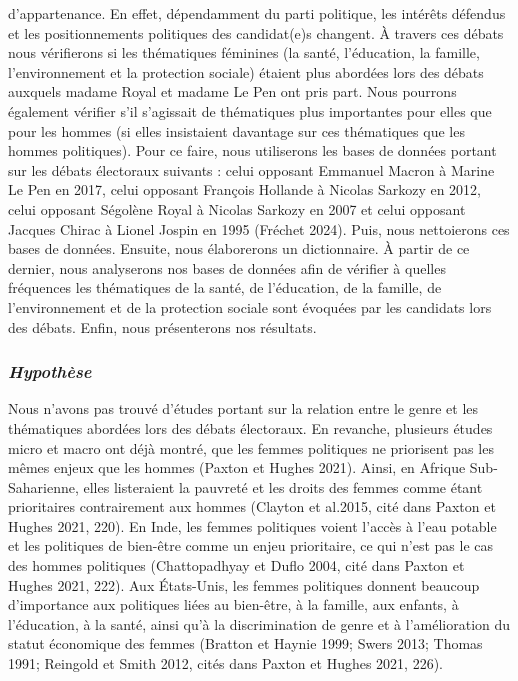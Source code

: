 \documentclass[
  letterpaper,
  DIV=11,
  numbers=noendperiod]{scrartcl}
\begin{document}
d'appartenance. En effet, dépendamment du parti politique, les intérêts
défendus et les positionnements politiques des candidat(e)s changent. À
travers ces débats nous vérifierons si les thématiques féminines (la
santé, l'éducation, la famille, l'environnement et la protection
sociale) étaient plus abordées lors des débats auxquels madame Royal et
madame Le Pen ont pris part. Nous pourrons également vérifier s'il
s'agissait de thématiques plus importantes pour elles que pour les
hommes (si elles insistaient davantage sur ces thématiques que les
hommes politiques). Pour ce faire, nous utiliserons les bases de données
portant sur les débats électoraux suivants : celui opposant Emmanuel
Macron à Marine Le Pen en 2017, celui opposant François Hollande à
Nicolas Sarkozy en 2012, celui opposant Ségolène Royal à Nicolas Sarkozy
en 2007 et celui opposant Jacques Chirac à Lionel Jospin en 1995
(Fréchet 2024). Puis, nous nettoierons ces bases de données. Ensuite,
nous élaborerons un dictionnaire. À partir de ce dernier, nous
analyserons nos bases de données afin de vérifier à quelles fréquences
les thématiques de la santé, de l'éducation, de la famille, de
l'environnement et de la protection sociale sont évoquées par les
candidats lors des débats. Enfin, nous présenterons nos résultats.

\hypertarget{hypothuxe8se}{%
\subsubsection{\texorpdfstring{\textbf{\emph{Hypothèse}}}{Hypothèse}}\label{hypothuxe8se}}

Nous n'avons pas trouvé d'études portant sur la relation entre le genre
et les thématiques abordées lors des débats électoraux. En revanche,
plusieurs études micro et macro ont déjà montré, que les femmes
politiques ne priorisent pas les mêmes enjeux que les hommes (Paxton et
Hughes 2021). Ainsi, en Afrique Sub-Saharienne, elles listeraient la
pauvreté et les droits des femmes comme étant prioritaires contrairement
aux hommes (Clayton et al.2015, cité dans Paxton et Hughes 2021, 220).
En Inde, les femmes politiques voient l'accès à l'eau potable et les
politiques de bien-être comme un enjeu prioritaire, ce qui n'est pas le
cas des hommes politiques (Chattopadhyay et Duflo 2004, cité dans Paxton
et Hughes 2021, 222). Aux États-Unis, les femmes politiques donnent
beaucoup d'importance aux politiques liées au bien-être, à la famille,
aux enfants, à l'éducation, à la santé, ainsi qu'à la discrimination de
genre et à l'amélioration du statut économique des femmes (Bratton et
Haynie 1999; Swers 2013; Thomas 1991; Reingold et Smith 2012, cités dans
Paxton et Hughes 2021, 226).
\end{document}

